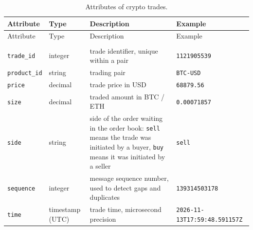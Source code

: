 \documentclass[
]{article}
\begin{document}
\begin{longtable}[]{@{}
  >{\raggedright\arraybackslash}p{}
  >{\raggedright\arraybackslash}p{}
  >{\raggedright\arraybackslash}p{}
  >{\raggedright\arraybackslash}p{}@{}}
\toprule\noalign{}
\begin{minipage}[b]{\linewidth}\raggedright
Attribute
\end{minipage} & \begin{minipage}[b]{\linewidth}\raggedright
Type
\end{minipage} & \begin{minipage}[b]{\linewidth}\raggedright
Description
\end{minipage} & \begin{minipage}[b]{\linewidth}\raggedright
Example
\end{minipage} \\
\midrule\noalign{}
\endfirsthead
\toprule\noalign{}
\begin{minipage}[b]{\linewidth}\raggedright
Attribute
\end{minipage} & \begin{minipage}[b]{\linewidth}\raggedright
Type
\end{minipage} & \begin{minipage}[b]{\linewidth}\raggedright
Description
\end{minipage} & \begin{minipage}[b]{\linewidth}\raggedright
Example
\end{minipage} \\
\midrule\noalign{}
\endhead
\bottomrule\noalign{}
\caption{Attributes of crypto trades.}\label{tbl-trades}\tabularnewline
\endlastfoot
\texttt{trade\_\allowbreak{}id} & integer & trade identifier, unique within a pair & \texttt{1121905539} \\
\midrule\noalign{}
\texttt{product\_\allowbreak{}id} & string & trading pair & \texttt{BTC-\allowbreak{}USD} \\
\midrule\noalign{}
\texttt{price} & decimal & trade price in USD & \texttt{68879.\allowbreak{}56} \\
\midrule\noalign{}
\texttt{size} & decimal & traded amount in BTC / ETH & \texttt{0.\allowbreak{}00071857} \\
\midrule\noalign{}
\texttt{side} & string & side of the order waiting in the order book: \texttt{sell} means the trade was initiated by a buyer, \texttt{buy} means it was initiated by a seller & \texttt{sell} \\
\midrule\noalign{}
\texttt{sequence} & integer & message sequence number, used to detect gaps and duplicates & \texttt{139314503178} \\
\midrule\noalign{}
\texttt{time} & timestamp (UTC) & trade time, microsecond precision & \texttt{2026-\allowbreak{}11-\allowbreak{}13T17:\allowbreak{}59:\allowbreak{}48.\allowbreak{}591157Z} \\
\end{longtable}
\end{document}
